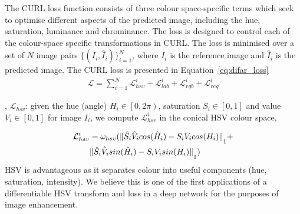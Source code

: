 \documentclass[a4paper,conference]{IEEEtran}
\def\xstrut{\rule{0pt}{2ex}}
\begin{document}
The CURL loss function consists of three colour space-specific terms which seek to optimise different aspects of the predicted image, including the hue, saturation, luminance and chrominance. The loss is designed to control each of the colour-space specific transformations in CURL. The loss is minimised over a set of $N$ image pairs $\{(I_{i},\hat{I}_{i})\}^{N}_{i=1}$, where $I_{i}$ is the reference image and $\hat{I}_{i}$ is the predicted image. The CURL loss is presented in Equation~\ref{eq:difar_loss}
\begin{eqnarray}
	\mathcal{L} = \sum^{N}_{i=1} \mathcal{L}_{hsv}^{i} + \mathcal{L}_{lab}^{i} + \mathcal{L}_{rgb}^{i} + \mathcal{L}_{reg}^{i}
	\label{eq:difar_loss}
\end{eqnarray}
{}


{}, $\mathcal{L}_{hsv}$: given the hue (angle) $H_{i}\in\left[0,2\pi\right)$, saturation $S_{i}\in\left[0,1\right]$ and value $V_{i}\in\left[0,1\right]$ for image $I_{i}$, we compute $\mathcal{L}_{hsv}^{i}$ in the conical HSV colour space,

\begin{align}
\mathcal{L}_{hsv}^{i} &= \omega_{hsv}(\Vert \hat{S}_{i}\hat{V}_{i}cos(\hat{H}_{i})-{S}_{i}{V}_{i}cos(H_{i})\Vert_{\xstrut 1}  + \nonumber \\ & \Vert\hat{S}_{i}\hat{V}_{i}sin(\hat{H}_{i})-{S}_{i}{V}_{i}sin(H_{i})\Vert_{\xstrut 1})
       \label{eq:hsvloss}
\end{align}
HSV is advantageous as it separates colour into useful components (hue, saturation, intensity). We believe this is one of the first applications of a differentiable HSV transform and loss in a deep network for the purposes of image enhancement. 
\end{document}
